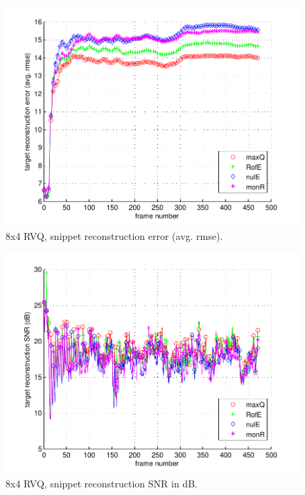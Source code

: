 								\begin{figure}[h!]
								\centering
								\includegraphics[height=0.4\textheight]{thesis/5_fish_8_4_1000_snp_armse.pdf}
								\caption{8x4 RVQ, snippet reconstruction error (avg. rmse).}
								\label{fig:5_fish_8_4_1000_snp_armse}
								\end{figure}

								\begin{figure}[h!]
								\centering
								\includegraphics[height=0.4\textheight]{thesis/5_fish_8_4_1000_snp_SNRdB.pdf}
								\caption{8x4 RVQ, snippet reconstruction SNR in dB.}
								\label{fig:5_fish_8_4_1000_snp_SNRdB}
								\end{figure}
\clearpage
\newpage
